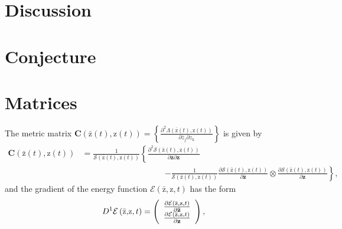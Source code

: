 \documentclass[aps,preprint]{revtex4}%
\begin{document}
\section{Discussion}

\appendix

\section{Conjecture\label{conjecture}}

\section{Matrices\label{Matrices}}

The metric matrix $\mathbf{C}\left(  \mathrm{\bar{z}}\left(  t\right)
,\mathrm{z}\left(  t\right)  \right)  =\left\{  \frac{\partial^{2}%
\Lambda\left(  \mathrm{\bar{z}}\left(  t\right)  ,\mathrm{z}\left(  t\right)
\right)  }{\partial\bar{z}_{j}\partial z_{k}}\right\}  $ is given by%
\begin{align}
\mathbf{C}\left(  \mathrm{\bar{z}}\left(  t\right)  ,\mathrm{z}\left(
t\right)  \right)   &  =\frac{1}{\mathcal{S}\left(  \mathrm{\bar{z}}\left(
t\right)  ,\mathrm{z}\left(  t\right)  \right)  }\left\{  \frac{\partial
^{2}\mathcal{S}\left(  \mathrm{\bar{z}}\left(  t\right)  ,\mathrm{z}\left(
t\right)  \right)  }{\partial\mathbf{\bar{z}}\partial\mathbf{z}}\right.
\nonumber\\
&  \qquad\qquad\qquad\qquad\qquad\left.  -\frac{1}{\mathcal{S}\left(
\mathrm{\bar{z}}\left(  t\right)  ,\mathrm{z}\left(  t\right)  \right)  }%
\frac{\partial\mathcal{S}\left(  \mathrm{\bar{z}}\left(  t\right)
,\mathrm{z}\left(  t\right)  \right)  }{\partial\mathbf{\bar{z}}}\otimes
\frac{\partial\mathcal{S}\left(  \mathrm{\bar{z}}\left(  t\right)
,\mathrm{z}\left(  t\right)  \right)  }{\partial\mathbf{z}}\right\}  ,
\end{align}
and the gradient of the energy function $\mathcal{E}\left(  \mathrm{\bar{z}%
}\mathbf{,}\mathrm{z},t\right)  $ has the form%
\begin{equation}
D^{1}\mathcal{E}\left(  \mathrm{\bar{z}}\mathbf{,}\mathrm{z},t\right)
=\left(
\begin{array}
[c]{c}%
\frac{\partial\mathcal{E}\left(  \mathrm{\bar{z}}\mathbf{,}\mathrm{z}%
,t\right)  }{\partial\mathbf{\bar{z}}}\\
\frac{\partial\mathcal{E}\left(  \mathrm{\bar{z}}\mathbf{,}\mathrm{z}%
,t\right)  }{\partial\mathbf{z}}%
\end{array}
\right)  ,
\end{equation}
\end{document}
